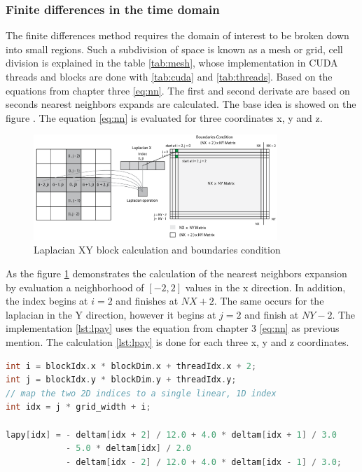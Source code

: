 \subsubsection{Finite differences in the time domain}

The finite differences method requires the domain of interest to be broken down into small regions. Such a subdivision of space is known as a mesh or grid, cell division is explained in the table \ref{tab:mesh}, whose implementation in CUDA threads and blocks are done with \ref{tab:cuda} and \ref{tab:threads}. Based on the equations from chapter three \ref{eq:nn}. The first and second derivate are based on seconds nearest neighbors expands are calculated. The base idea is showed on the figure	 \label{fig:laplacian}. The equation \ref{eq:nn} is evaluated for three coordinates x, y and z.

\begin{figure}[htbp]
	\centering
		\includegraphics[width=0.82\textwidth]{Figures/laplacian.png}
		\smallskip
	\caption[Laplacian block calculation]{Laplacian XY block calculation and boundaries condition}
	\label{fig:laplacian}
\end{figure}

As the figure \ref{fig:laplacian} demonstrates the calculation of the nearest neighbors expansion by evaluation a neighborhood of $[-2, 2]$ values in the x direction. In addition, the index begins at $i = 2$ and finishes at $NX + 2$. The same occurs for the laplacian in the Y direction, however it begins at $j = 2$ and finish at $NY -2$.  The implementation \ref{lst:lpay} uses the equation from chapter 3 \ref{eq:nn} as previous mention. The calculation \ref{lst:lpay} is done for each three x, y and z coordinates. 

\begin{lstlisting}[language=C++, label={lst:lpay}, caption={Laplacian X using global memory}]
int i = blockIdx.x * blockDim.x + threadIdx.x + 2;
int j = blockIdx.y * blockDim.y + threadIdx.y;
// map the two 2D indices to a single linear, 1D index
int idx = j * grid_width + i;

lapy[idx] = - deltam[idx + 2] / 12.0 + 4.0 * deltam[idx + 1] / 3.0
			- 5.0 * deltam[idx] / 2.0
			- deltam[idx - 2] / 12.0 + 4.0 * deltam[idx - 1] / 3.0;	
\end{lstlisting}



